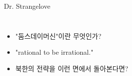 \documentclass[final]{beamer}
\begin{document}
\begin{frame}[t]{Dr. Strangelove}
	\begin{columns}[c]
		\begin{itemize}
			\item "둠스데이머신"이란 무엇인가? 
			\item "rational to be irrational."
			\item 북한의 전략을 이런 면에서 돌아본다면?
		\end{itemize}
	\end{columns}
\end{frame}
\end{document}
